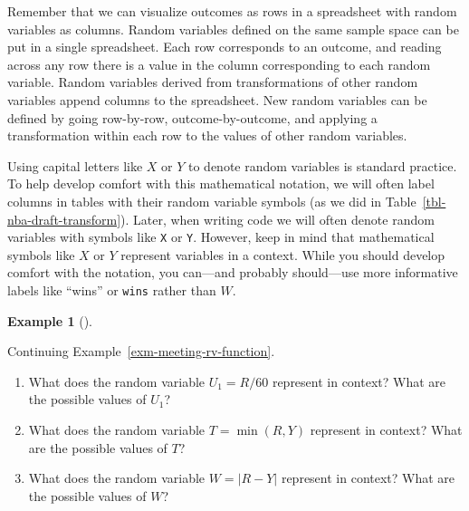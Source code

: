 \documentclass[
  letterpaper,
  DIV=11,
  numbers=noendperiod]{scrreprt}
\providecommand{\tightlist}{%
  \setlength{\itemsep}{0pt}\setlength{\parskip}{0pt}}
\theoremstyle{plain}
\theoremstyle{definition}
\newtheorem{example}{Example}[chapter]
\theoremstyle{definition}
\theoremstyle{definition}
\theoremstyle{remark}
\begin{document}
Remember that we can visualize outcomes as rows in a spreadsheet with
random variables as columns. Random variables defined on the same sample
space can be put in a single spreadsheet. Each row corresponds to an
outcome, and reading across any row there is a value in the column
corresponding to each random variable. Random variables derived from
transformations of other random variables append columns to the
spreadsheet. New random variables can be defined by going row-by-row,
outcome-by-outcome, and applying a transformation within each row to the
values of other random variables.

Using capital letters like \(X\) or \(Y\) to denote random variables is
standard practice. To help develop comfort with this mathematical
notation, we will often label columns in tables with their random
variable symbols (as we did in Table~\ref{tbl-nba-draft-transform}).
Later, when writing code we will often denote random variables with
symbols like \texttt{X} or \texttt{Y}. However, keep in mind that
mathematical symbols like \(X\) or \(Y\) represent variables in a
context. While you should develop comfort with the notation, you
can---and probably should---use more informative labels like ``wins'' or
\texttt{wins} rather than \(W\).

\begin{tcolorbox}[enhanced jigsaw, opacityback=0, left=2mm, colframe=quarto-callout-note-color-frame, toprule=.15mm, breakable, colback=white, leftrule=.75mm, arc=.35mm, rightrule=.15mm, bottomrule=.15mm]

\begin{example}[]\protect\hypertarget{exm-meeting-rv}{}\label{exm-meeting-rv}

Continuing Example~\ref{exm-meeting-rv-function}.

\begin{enumerate}
\def\labelenumi{\arabic{enumi}.}
\tightlist
\item
  What does the random variable \(U_1 = R / 60\) represent in context?
  What are the possible values of \(U_1\)?
\item
  What does the random variable \(T = \min(R, Y)\) represent in context?
  What are the possible values of \(T\)?
\item
  What does the random variable \(W = |R - Y|\) represent in context?
  What are the possible values of \(W\)?
\end{enumerate}

\end{example}

\end{tcolorbox}
\end{document}
